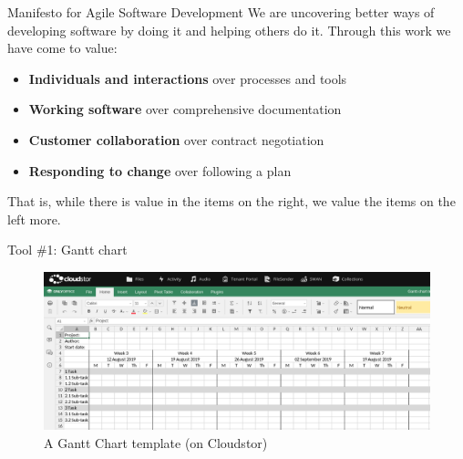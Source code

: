 \documentclass[aspectratio=1610, 11pt]{beamer} %
\begin{document}
 \begin{frame}{Manifesto for Agile Software Development}
 We are uncovering better ways of developing software by doing it and helping others do it. Through this work we have come to value:
     \begin{itemize}[label=\textbullet]
         \item \textbf{Individuals and interactions} over processes and tools
         \item \textbf{Working software} over comprehensive documentation
         \item \textbf{Customer collaboration} over contract negotiation
         \item \textbf{Responding to change} over following a plan
     \end{itemize}
 That is, while there is value in the items on the right, we value the items on the left more. \cite{Atlassian2019-xl}
 \end{frame}

 \begin{frame}{Tool \#1: Gantt chart}
  \begin{figure}[Gantt]
     \centering
         \includegraphics[height=.75\textheight]{figures/gantt.png}
         \caption{A Gantt Chart template (on Cloudstor)}
         \label{fig:8}
  \end{figure}
 \end{frame}
\end{document}
